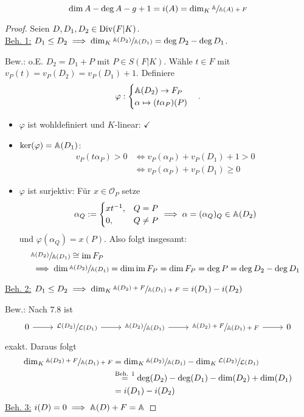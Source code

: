 \begin{satz}
    $$ \dim A - \deg A - g +1 = i(A) = \dim_K \sfrac{\mathbb{A}}{\mathbb{A}(A)+F}$$
\end{satz}
\begin{proof}
    Seien $D,D_1,D_2 \in \operatorname{Div}(F|K)$.\\
    \underline{Beh. 1:} $D_1 \leq D_2 \implies \dim_K \sfrac{\mathbb{A}(D_2)}{\mathbb{A}(D_1)} = \deg D_2 - \deg D_1$.

    Bew.: o.E. $D_2 = D_1 + P$ mit $P \in S(F|K)$. Wähle $t \in F$ mit $v_P(t) = v_P(D_2) = v_P(D_1) + 1$.
    Definiere $$ \varphi : \begin{cases}
        \mathbb{A}(D_2) \to F_P\\
        \alpha \mapsto (t\alpha_P)(P)
    \end{cases}.$$
    \begin{itemize}
        \item $\varphi$ ist wohldefiniert und $K$-linear: $\checkmark$
        \item $\ker(\varphi) = \mathbb{A}(D_1)$:
        \begin{align*}
            v_P(t \alpha_P) > 0 & \iff v_P(\alpha_P) + v_P(D_1) + 1 > 0\\
            &\iff v_P(\alpha_P) + v_P(D_1) \geq 0
        \end{align*}
        \item $\varphi$ ist surjektiv: Für $x \in \mathcal{O}_P$ setze
        $$ \alpha_Q := \begin{cases}
            xt^{-1}, & Q=P\\
            0, & Q \ne P
        \end{cases} \implies \alpha = (\alpha_Q)_Q \in \mathbb{A}(D_2)$$
        und $ \varphi(\alpha_Q) = x(P)$.
        Also folgt insgesamt:
        \begin{align*}
            &\sfrac{\mathbb{A}(D_2)}{\mathbb{A}(D_1)} \cong \operatorname{im} F_P\\
            &\implies \dim \sfrac{\mathbb{A}(D_2)}{\mathbb{A}(D_1)} = \dim \operatorname{im} F_P = \dim F_P = \deg P = \deg D_2 - \deg D_1
        \end{align*}
    \end{itemize}
    \underline{Beh. 2:} $D_1 \leq D_2 \implies \dim_K \sfrac{\mathbb{A}(D_2) + F}{\mathbb{A}(D_1) + F} = i(D_1) - i(D_2)$

    Bew.: Nach 7.8 ist
    $$\begin{tikzcd}
        0 \ar[r] &\sfrac{\mathcal{L}(D_2)}{\mathcal{L}(D_1)} \ar[r] &\sfrac{\A(D_2)}{\A(D_1)} \ar[r] &\sfrac{\A(D_2)+F}{\A(D_1)+F} \ar[r] &0 
    \end{tikzcd}$$
    exakt. Daraus folgt
    \begin{align*}
        \dim_K \sfrac{\mathbb{A}(D_2)+F}{\mathbb{A}(D_1)+F} &= \dim_K \sfrac{\mathbb{A}(D_2)}{\mathbb{A}(D_1)} - \dim_K \sfrac{\mathcal{L}(D_2)}{\mathcal{L}(D_1)}\\
        &\overset{\text{Beh. 1}}{=} \deg(D_2) - \deg(D_1) - \dim(D_2) + \dim(D_1)\\
        &=i(D_1) - i(D_2)
    \end{align*}
    \underline{Beh. 3:} $i(D) = 0 \implies \mathbb{A}(D) + F = \mathbb{A}$


\end{proof}
